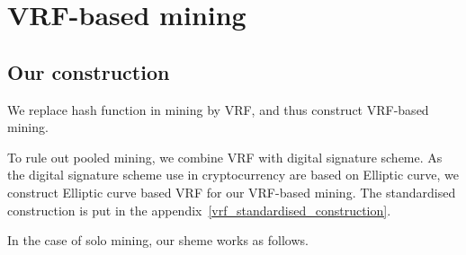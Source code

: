 \section{VRF-based mining}

\subsection{Our construction}

We replace hash function in mining by VRF, and thus construct VRF-based mining.

To rule out pooled mining, we combine VRF with digital signature scheme.
As the digital signature scheme use in cryptocurrency are based on Elliptic curve, we construct Elliptic curve based VRF for our VRF-based mining.
The standardised construction is put in the appendix~\ref{vrf_standardised_construction}.


In the case of solo mining, our sheme works as follows.

